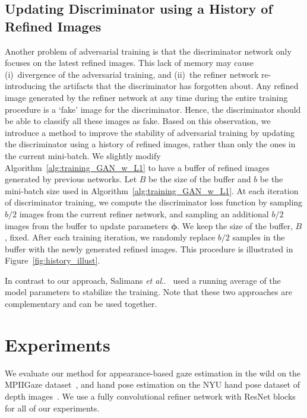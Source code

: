 \documentclass[10pt,twocolumn,letterpaper]{article}
\makeatletter
\DeclareRobustCommand\onedot{\futurelet\@let@token\@onedot}
\def\@onedot{\ifx\@let@token.\else.\null\fi\xspace}
\def\etal{\emph{et al}\onedot}
\makeatother
\begin{document}
\subsection{Updating Discriminator using a History of Refined Images}
Another problem of adversarial training is that the discriminator network only focuses on the latest refined images. 
This lack of memory may cause (i)~divergence of the adversarial training, and (ii)~the refiner network re-introducing the artifacts that the discriminator has forgotten about. 
Any refined image generated by the refiner network at any time during the entire training procedure is a `fake' image for the discriminator.
Hence, the discriminator should be able to classify all these images as fake.
Based on this observation, we introduce a method to improve the stability of adversarial training by updating the discriminator using a history of refined images, rather than only the ones in the current mini-batch.
We slightly modify Algorithm~\ref{alg:training_GAN_w_L1} to have a buffer of refined images generated by previous networks. 
Let $B$ be the size of the buffer and $b$ be the mini-batch size used in Algorithm~\ref{alg:training_GAN_w_L1}. 
At each iteration of discriminator training, we compute the discriminator loss function by sampling  $b/2$ images from the current refiner network, and sampling an additional $b/2$ images from the buffer to update parameters $\boldsymbol \phi$. 
We keep the size of the buffer, $B$, fixed. 
After each training iteration, we randomly replace $b/2$ samples in the buffer with the newly generated refined images. 
This procedure is illustrated in Figure~\ref{fig:history_illust}.

In contrast to our approach, Salimans \etal~\cite{Salimans16} used  a running average of the model parameters to stabilize the training. 
Note that these two approaches are complementary and can be used together. 










\section{Experiments}

We evaluate our method for appearance-based gaze estimation in the wild on the MPIIGaze dataset~\cite{Wood16,Zhang15a}, and hand pose estimation on the NYU hand pose dataset of depth images~\cite{tompson14NYU}. 
We use a fully convolutional refiner network with ResNet blocks for all of our experiments.
\end{document}
